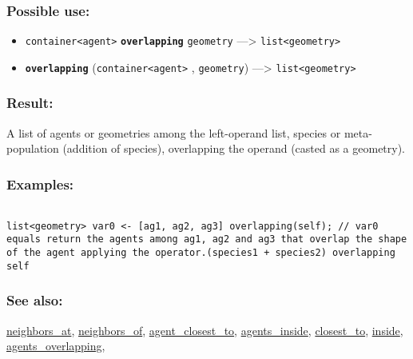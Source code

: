 \documentclass[]{book}
\providecommand{\tightlist}{%
  \setlength{\itemsep}{0pt}\setlength{\parskip}{0pt}}
\theoremstyle{definition}
\theoremstyle{definition}
\theoremstyle{definition}
\theoremstyle{remark}
\begin{document}
\subsubsection{Possible use:}\label{possible-use-390}

\begin{itemize}
\tightlist
\item
  \texttt{container\textless{}agent\textgreater{}}
  \textbf{\texttt{overlapping}} \texttt{geometry} ---\textgreater{}
  \texttt{list\textless{}geometry\textgreater{}}
\item
  \textbf{\texttt{overlapping}}
  (\texttt{container\textless{}agent\textgreater{}} , \texttt{geometry})
  ---\textgreater{} \texttt{list\textless{}geometry\textgreater{}}
\end{itemize}

\subsubsection{Result:}\label{result-376}

A list of agents or geometries among the left-operand list, species or
meta-population (addition of species), overlapping the operand (casted
as a geometry).

\subsubsection{Examples:}\label{examples-268}

\begin{verbatim}
 
list<geometry> var0 <- [ag1, ag2, ag3] overlapping(self); // var0 equals return the agents among ag1, ag2 and ag3 that overlap the shape of the agent applying the operator.(species1 + species2) overlapping self 
\end{verbatim}

\subsubsection{See also:}\label{see-also-156}

\href{operators-n-to-r.html\#neighbors_at}{neighbors\_at},
\href{operators-n-to-r.html\#neighbors_of}{neighbors\_of},
\href{operators-a-to-a.html\#agent_closest_to}{agent\_closest\_to},
\href{operators-a-to-a.html\#agents_inside}{agents\_inside},
\href{operators-b-to-c.html\#closest_to}{closest\_to},
\href{operators-i-to-m.html\#inside}{inside},
\href{operators-a-to-a.html\#agents_overlapping}{agents\_overlapping},
\end{document}

